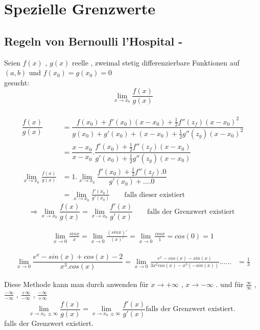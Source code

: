 \section{Spezielle Grenzwerte}
\subsection{Regeln von Bernoulli l'Hospital -}
Seien $ f(x) $ , $g(x)$ reelle , zweimal stetig differenzierbare Funktionen auf $(a,b)$ und $f(x_0) = g(x_0) = 0$\\
gesucht: $$\lim_{x \to x_0}{\frac{f(x)}{g(x)}}$$\\
\begin{align*}
\dfrac{f(x)}{g(x)} &=
\dfrac{f(x_0) + f'(x_0)(x - x_0)+ \frac{1}{2}  f''(z_f)(x-x_0)^2}
{g(x_0) + g'(x_0) + (x - x_0) + \frac{1}{2}  g''(z_g)(x - x_0)^2 }\\
&= \dfrac{x - x_0}{x - x_0} . 
{ \dfrac 
{f'(x_0) + \frac{1}{2} f''(z_f )(x-x_0)}
{g'(x_0) + \frac{1}{2} g''(z_g )(x-x_0)} 
} \\
\lim\limits_{x \rightarrow x_0} \frac{f(x)}{g(x)}&=1.\lim_{x \to x_0}\dfrac{f'(x_0)+\frac{1}{2} f''(z_f).0}{g'(x_0)+\dots .0}\\
&= \lim_{x \to x_0}{\frac{f'(x_0)}{g'(x_0)}} \qquad \text{falls dieser existiert}
\end{align*}
\[\Rightarrow \lim_{x \to x_0}{\frac{f(x)}{g(x)}} =
\lim_{x \to x_0}{\frac{f'(x)}{g'(x)}}   \qquad \text{falls der Grenzwert existiert }\]
\begin{example}
\begin{gather*}
\lim_{x \to 0}{\frac{sin x}{x}} =
 \lim_{x \to 0}{\frac{(sin x)'}{(x)'}}
= \lim_{x \to 0}{\frac{cos x}{1}} = cos(0) = 1
\end{gather*}
\end{example}
\begin{example}
\begin{align*}
\lim_{x \to 0}{\dfrac{e^x - sin(x) + cos(x)-2}{x^3 . cos(x)}} 
= \lim_{x \to 0 }{\frac{e^x - cos(x) - sin(x)}{3x^2 cos(x)-x^3(-sin(x))}} \dots \dots &= \frac{1}{3}
\end{align*}
\end{example}
\begin{remark}
Diese Methode kann man durch anwenden für $x \to + \infty$ , $x \to - \infty$ . und für $\frac{\infty}{\infty}$ , $\frac{-\infty}{-\infty}$ , $\frac{+\infty}{-\infty}$ , $\frac{-\infty}{+\infty}$\\
\[ \lim_{x \to x_0 \ \pm \infty}{\frac{f(x)}{g(x)}}= 
\lim_{x \to x_0 \ \pm \infty}{\frac{f'(x)}{g'(x)}} \text{falls der Grenzwert existiert. }\]
falls der Grenzwert existiert. 
\end{remark}
